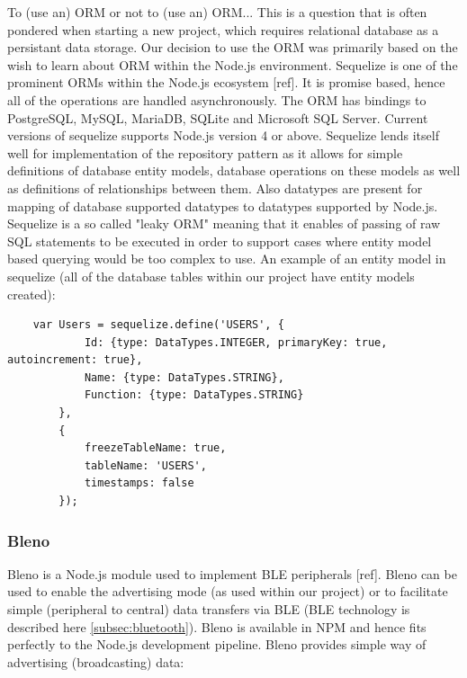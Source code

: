 To (use an) ORM or not to (use an) ORM... This is a question that is often pondered when starting a new project, which requires relational database as a persistant data storage. Our decision to use the ORM was primarily based on the wish to learn about ORM within the Node.js environment. Sequelize is one of the prominent ORMs within the Node.js ecosystem [ref]. It is promise based, hence all of the operations are handled asynchronously. The ORM has bindings to PostgreSQL, MySQL, MariaDB, SQLite and Microsoft SQL Server. Current versions of sequelize supports Node.js version 4 or above. Sequelize lends itself well for implementation of the repository pattern as it allows for simple definitions of database entity models, database operations on these models as well as definitions of relationships between them. Also datatypes are present for mapping of database supported datatypes to datatypes supported by Node.js. Sequelize is a so called "leaky ORM" meaning that it enables of passing of raw SQL statements to be executed in order to support cases where entity model based querying would be too complex to use. An example of an entity model in sequelize (all of the database tables within our project have entity models created):\newline

\smallskip
\begin{lstlisting}
    var Users = sequelize.define('USERS', {
            Id: {type: DataTypes.INTEGER, primaryKey: true, autoincrement: true},
            Name: {type: DataTypes.STRING},
            Function: {type: DataTypes.STRING}
        },
        {
            freezeTableName: true,
            tableName: 'USERS',
            timestamps: false
        });
\end{lstlisting}
\smallskip

\subsubsection{Bleno}
\label{subsubsec:bleno}

Bleno is a Node.js module used to implement BLE peripherals [ref]. Bleno can be used to enable the advertising mode (as used within our project) or to facilitate simple (peripheral to central) data transfers via BLE (BLE technology is described here \autoref{subsec:bluetooth}). Bleno is available in NPM and hence fits perfectly to the Node.js development pipeline. Bleno provides simple way of advertising (broadcasting) data: \newline

